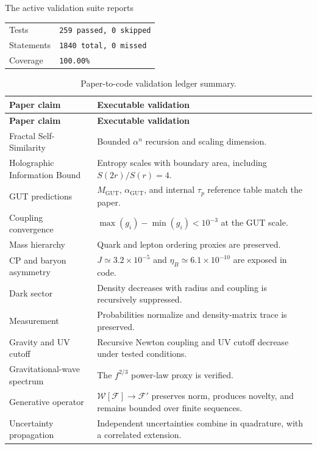 \documentclass[12pt]{article}
\theoremstyle{remark}
\newcommand{\F}{\mathcal{F}}
\newcommand{\W}{\mathcal{W}}
\newcommand{\MGUT}{M_{\mathrm{GUT}}}
\newcommand{\aGUT}{\alpha_{\mathrm{GUT}}}
\begin{document}
The active validation suite reports
\begin{center}
\begin{tabular}{ll}
\toprule
Tests & \texttt{259 passed, 0 skipped}\\
Statements & \texttt{1840 total, 0 missed}\\
Coverage & \texttt{100.00\%}\\
\bottomrule
\end{tabular}
\end{center}

\begin{longtable}{>{\raggedright\arraybackslash}p{}>{\raggedright\arraybackslash}p{}}
\caption{Paper-to-code validation ledger summary.}\\
\toprule
\textbf{Paper claim} & \textbf{Executable validation}\\
\midrule
\endfirsthead
\toprule
\textbf{Paper claim} & \textbf{Executable validation}\\
\midrule
\endhead
Fractal Self-Similarity & Bounded $\alpha^n$ recursion and scaling dimension.\\
Holographic Information Bound & Entropy scales with boundary area, including
$S(2r)/S(r)=4$.\\
GUT predictions & $\MGUT$, $\aGUT$, and internal $\tau_p$ reference table match
the paper.\\
Coupling convergence & $\max(g_i)-\min(g_i)<10^{-3}$ at the GUT scale.\\
Mass hierarchy & Quark and lepton ordering proxies are preserved.\\
CP and baryon asymmetry & $J\simeq3.2\times10^{-5}$ and
$\eta_B\simeq6.1\times10^{-10}$ are exposed in code.\\
Dark sector & Density decreases with radius and coupling is recursively
suppressed.\\
Measurement & Probabilities normalize and density-matrix trace is preserved.\\
Gravity and UV cutoff & Recursive Newton coupling and UV cutoff decrease under
tested conditions.\\
Gravitational-wave spectrum & The $f^{2/3}$ power-law proxy is verified.\\
Generative operator & $\W[\F]\to\F'$ preserves norm, produces novelty, and
remains bounded over finite sequences.\\
Uncertainty propagation & Independent uncertainties combine in quadrature, with
a correlated extension.\\
\bottomrule
\end{longtable}
\end{document}
